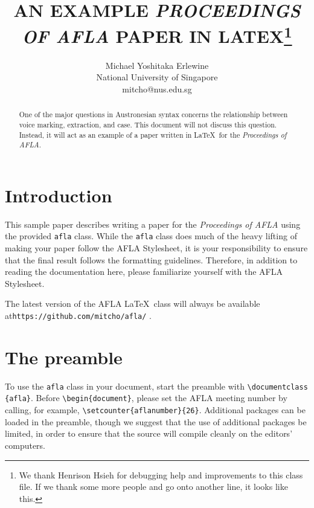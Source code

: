 \documentclass{afla}
\begin{document}
\title{\MakeUppercase{An example \textit{Proceedings of AFLA} paper in LaTeX}\thanks{We thank Henrison Hsieh for debugging help and improvements to this class file. If we thank some more people and go onto another line, it looks like this.}}

\author{Michael Yoshitaka Erlewine\\
	National University of Singapore\\
	mitcho@nus.edu.sg}


\maketitle

\begin{abstract}
One of the major questions in Austronesian syntax concerns the relationship between voice marking, extraction, and case. This document will not discuss this question. Instead, it will act as an example of a paper written in \LaTeX\ for the \textit{Proceedings of AFLA}.
\end{abstract}

\section{Introduction}

This sample paper describes writing a paper for the \textit{Proceedings of AFLA} using the provided \verb`afla` class. While the \verb`afla` class does much of the heavy lifting of making your paper follow the AFLA Stylesheet, it is your responsibility to ensure that the final result follows the formatting guidelines. Therefore, in addition to reading the documentation here, please familiarize yourself with the AFLA Stylesheet.

The latest version of the AFLA \LaTeX\ class will always be available at\linebreak \verb`https://github.com/mitcho/afla/` .

\section{The preamble}

To use the \verb`afla` class in your document, start the preamble with \verb`\documentclass` \verb`{afla}`. Before \verb`\begin{document}`, please set the AFLA meeting number by calling, for example, \verb`\setcounter{aflanumber}{26}`. Additional packages can be loaded in the preamble, though we suggest that the use of additional packages be limited, in order to ensure that the source will compile cleanly on the editors' computers.
\end{document}
